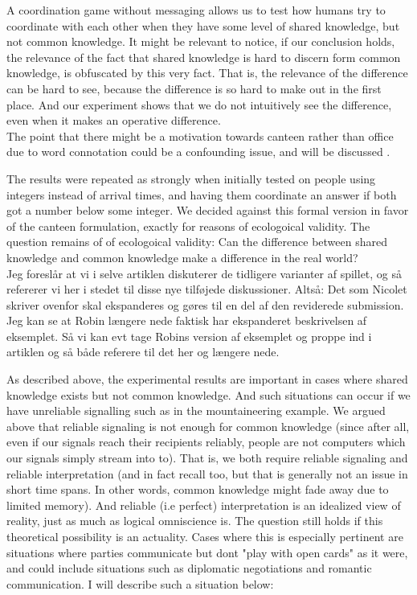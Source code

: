 \documentclass[a4paper]{article}
\newenvironment{tsn}{\smallskip \noindent \color{purple}}{\color{black}\smallskip}
\newenvironment{tobo}{\smallskip \noindent \color{yellow!80!black!80}}{\color{black}\smallskip}
\begin{document}
\begin{tsn}
A coordination game without messaging allows us to test how humans try to coordinate with each other when they have some level of shared knowledge, but not common knowledge. It might be relevant to notice, if our conclusion holds, the relevance of the fact that shared knowledge is hard to discern form common knowledge, is obfuscated by this very fact. That is, the relevance of the difference can be hard to see, because the difference is so hard to make out in the first place. And our experiment shows that we do not intuitively see the difference, even when it makes an operative difference. \\

The point that there might be a motivation towards canteen rather than office due to word connotation could be a confounding issue, and will be discussed . 

The results were repeated as strongly when initially tested on people using integers instead of arrival times, and having them coordinate an answer if both got a number below some integer. We decided against this formal version in favor of the canteen formulation, exactly for reasons of ecologoical validity. The question remains of of ecologoical validity: Can the difference between shared knowledge and common knowledge make a difference in the real world? \\
\begin{tobo}
Jeg foreslår at vi i selve artiklen diskuterer de tidligere varianter af spillet, og så refererer vi her i stedet til disse nye tilføjede diskussioner. Altså: Det som Nicolet skriver ovenfor skal ekspanderes og gøres til en del af den reviderede submission. Jeg kan se at Robin længere nede faktisk har ekspanderet beskrivelsen af eksemplet. Så vi kan evt tage Robins version af eksemplet og proppe ind i artiklen og så både referere til det her og længere nede. 
\end{tobo}



As described above, the experimental results are important in cases where shared knowledge exists but not common knowledge. And such situations can occur if we have unreliable signalling such as in the mountaineering example. We argued above that reliable signaling is not enough for common knowledge (since after all, even if our signals reach their recipients reliably, people are not computers which our signals simply stream into to). That is, we both require reliable signaling and reliable interpretation (and in fact recall too, but that is generally not an issue in short time spans. In other words, common knowledge might fade away due to limited memory). And reliable (i.e perfect) interpretation is an idealized view of reality, just as much as logical omniscience is. The question still holds if this theoretical possibility is an actuality. Cases where this is especially pertinent are situations where parties communicate but dont "play with open cards" as it were, and could include situations such as diplomatic negotiations and romantic communication.  I will describe such a situation below: \\


\end{tsn}
\end{document}
